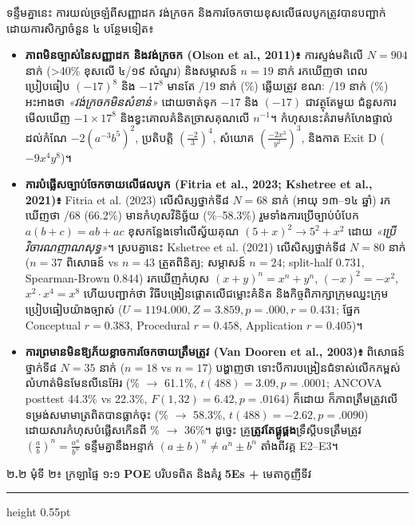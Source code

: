 \documentclass[a4paper,12pt]{article}
\newcommand{\en}[1]{{\TimesEn #1}}
\newcommand{\enbf}[1]{{\TimesEn\textbf{#1}}}
\newcommand{\subsectitle}[1]{{\muol\fontsize{11.5pt}{18.5pt}\selectfont #1}}
\newcommand{\subsec}[1]{%
  \Needspace{1.7cm}%
  \vspace{3pt}%
  \subsectitle{#1}\par%
  \vspace{-2pt}%
  {\color{black}\hrule height 0.55pt}%
  \vspace{3pt}%
}
\begin{document}
ទន្ទឹមគ្នានេះ ការយល់ច្រឡំពីសញ្ញាដក វង់ក្រចក និងការចែកចាយខុសលើផលបូកត្រូវបានបញ្ជាក់ដោយការសិក្សាចំនួន ៤ បន្ថែមទៀត៖
\begin{itemize}[leftmargin=0.65cm]
  \item \textbf{ភាពមិនច្បាស់នៃសញ្ញាដក និងវង់ក្រចក (\en{Olson et al., 2011})៖} ការស្ទង់មតិលើ \en{$N = 904$} នាក់ (\en{>40\%} ខុសលើ ៤/១៩ សំណួរ) និងសម្ភាសន៍ \en{$n = 19$} នាក់ រកឃើញថា ពេលប្រៀបធៀប $(-17)^8$ និង $-17^8$ មានតែ \en{5/19} នាក់ (\en{26.3\%}) ឆ្លើយត្រូវ ខណៈ \en{6/19} នាក់ (\en{31.6\%}) អះអាងថា \textit{«វង់ក្រចកមិនសំខាន់»} ដោយចាត់ទុក $-17$ និង $(-17)$ ជាវត្ថុតែមួយ ជំនួសការមើលឃើញ $-1 \times 17^8$ និងខ្វះគោលគំនិតច្រាសគុណលើ $n^{-1}$។ កំហុសនេះគំរាមកំហែងផ្ទាល់ដល់កំណែ $-2(a^{-3}b^5)^2$, ប្រតិបត្តិ $\left(\frac{-2}{3}\right)^4$, សំយោគ $\left(\frac{-2x^3}{y^2}\right)^3$, និងកាត \en{Exit D} ($-9x^4y^8$)។
  \item \textbf{ការបំផ្លើសច្បាប់ចែកចាយលើផលបូក (\en{Fitria et al., 2023; Kshetree et al., 2021})៖} \en{Fitria et al. (2023)} លើសិស្សថ្នាក់ទី៨ \en{$N = 68$} នាក់ (អាយុ ១៣--១៤ ឆ្នាំ) រកឃើញថា \en{45/68 (66.2\%)} មានកំហុសវិនិច្ឆ័យ (\en{20.8\%--58.3\%}) រួមទាំងការប្រើច្បាប់បំបែក $a(b+c)=ab+ac$ ខុសកន្លែងទៅលើស្វ័យគុណ $(5+x)^2 \to 5^2+x^2$ ដោយ \textit{«ប្រើវិចារណញាណសុទ្ធ»}។ ស្របគ្នានេះ \en{Kshetree et al. (2021)} លើសិស្សថ្នាក់ទី៨ \en{$N = 80$} នាក់ (\en{$n = 37$} ពិសោធន៍ \en{vs} \en{$n = 43$} ត្រួតពិនិត្យ; សម្ភាសន៍ \en{$n = 24$}; \en{split-half 0.731, Spearman-Brown 0.844}) រកឃើញកំហុស $(x+y)^n = x^n+y^n$, $(-x)^2 = -x^2$, $x^2\cdot x^4 = x^8$ ហើយបញ្ជាក់ថា វិធីបង្រៀនផ្ដោតលើជម្លោះគំនិត និងកិច្ចពិភាក្សាក្រុមឈ្នះក្រុមប្រៀបធៀបយ៉ាងច្បាស់ (\en{$U = 1194.000, Z = 3.859, p = .000, r = 0.431$}; ផ្នែក \en{Conceptual $r = 0.383$, Procedural $r = 0.458$, Application $r = 0.405$})។
  \item \textbf{ការព្រមានមិនឱ្យភ័យខ្លាចការចែកចាយត្រឹមត្រូវ (\en{Van Dooren et al., 2003})៖} ពិសោធន៍ថ្នាក់ទី៨ \en{$N = 35$} នាក់ (\en{$n = 18$} \en{vs} \en{$n = 17$}) បង្ហាញថា ទោះបីការបង្រៀនជំទាស់លើកកម្ពស់លំហាត់មិនមែនលីនេអ៊ែរ (\en{29.2\% $\to$ 61.1\%}, \en{$t(488) = 3.09, p = .0001$}; \en{ANCOVA posttest 44.3\% vs 22.3\%}, \en{$F(1,32) = 6.42, p = .0164$}) ក៏ដោយ ក៏ភាពត្រឹមត្រូវលើទម្រង់សមាមាត្រពិតបានធ្លាក់ចុះ (\en{83.3\% $\to$ 58.3\%}, \en{$t(488) = -2.62, p = .0090$}) ដោយសារកំហុសបំផ្លើសកើនពី \en{13\% $\to$ 36\%}។ ដូច្នេះ គ្រូ\textbf{ត្រូវតែផ្គូផ្គង}ទ្រឹស្ដីបទត្រឹមត្រូវ $\left(\frac{a}{b}\right)^n = \frac{a^n}{b^n}$ ទន្ទឹមគ្នានឹងអន្ទាក់ $(a\pm b)^n \neq a^n\pm b^n$ តាំងពីវគ្គ \en{E2--E3}។
\end{itemize}

\subsec{២\enbf{.}២ មុំទី ២៖ ក្រឡាផ្ទៃ ១\enbf{:}១ \enbf{POE} បរិបទពិត និងគំរូ \enbf{5Es +} មេតាកូញីទីវ}
\end{document}
